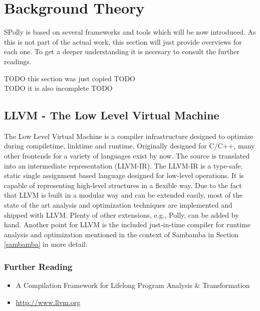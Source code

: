 
\chapter{Background Theory} %
\label{Chapter2}

SPolly is based on several frameworks and tools which will be now introduced. 
As this is not part of the actual work,
this section will just provide overviews for each one. 
To get a deeper understanding it is necesary to consult the further readings.

\begin{center}
TODO this section was just copied TODO \\
TODO it is also incomplete TODO 
\end{center}

\section{LLVM - The Low Level Virtual Machine}
\label{LLVM}
The Low Level Virtual Machine is a compiler infrastructure designed to optimize
during compiletime, linktime and runtime. Originally designed for C/C++, 
many other frontends for a variety of languages exist by now. The source is 
translated into an intermediate representation (LLVM-IR). 
The LLVM-IR is a type-safe, static single
assignment based language designed for low-level operations. It is capable of 
representing high-level structures in a flexible way.
Due to the fact that LLVM is built in a modular 
way and can be extended easily, most of the state of the art analysis and
optimization techniques are implemented and shipped with LLVM. Plenty of other
extensions, e.g., Polly, can be added by hand. 
Another point for LLVM is the 
included just-in-time compiler for runtime analysis and optimization mentioned
in the context of Sambamba in Section \ref{sambamba} in more detail.

\subsection*{Further Reading}

\begin{itemize}
  \item A Compilation Framework for Lifelong Program Analysis \& Transformation
    \cite{LLVM:CGO04}  
  \item \url{http://www.llvm.org} \nocite{LLVM:Online}
\end{itemize}


